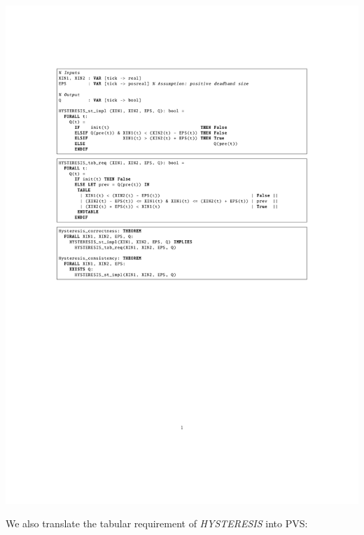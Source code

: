 \documentclass[a0,landscape]{a0poster}
\def\graphspacing{\vspace{.5cm}}
\newcommand{\capcolor}[1]{{\color{Black} #1}}
\newcommand{\var}[1]{{\small \textit{#1}}}
\begin{document}
\begin{multicols}{4}
\begin{center}\graphspacing
\includegraphics[width=\linewidth]{figures/hysteresis/hysteresis_pvs_st_impl}
\end{center}\graphspacing

\noindent We also translate the tabular requirement of \var{HYSTERESIS} into PVS:


\end{multicols}
\end{document}
